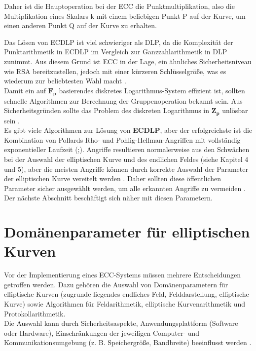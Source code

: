 Daher ist die Hauptoperation bei der ECC die Punktmultiplikation, also die Multiplikation eines Skalars k mit einem beliebigen Punkt P auf der Kurve, um einen anderen Punkt Q auf der Kurve zu erhalten. 

Das Lösen von ECDLP ist viel schwieriger als DLP, da die Komplexität der Punktarithmetik in ECDLP im Vergleich zur Ganzzahlarithmetik in DLP zunimmt. 
Aus diesem Grund ist ECC in der Lage, ein ähnliches Sicherheitsniveau wie RSA bereitzustellen, jedoch mit einer kürzeren Schlüsselgröße, was es wiederum zur beliebtesten Wahl macht \cite{mo2014}.\\ 

Damit ein auf $ \mathbf{F_p} $ basierendes diskretes Logarithmus-System effizient ist, sollten schnelle Algorithmen zur Berechnung der Gruppenoperation bekannt sein. Aus Sicherheitsgründen sollte das Problem des diskreten Logarithmus in $ \mathbf{Z_p} $ unlösbar sein \cite{Hankerson}. \\
Es gibt viele Algorithmen zur Lösung von \textbf{ECDLP}, aber der erfolgreichste ist die Kombination von Pollards Rho- und Pohlig-Hellman-Angriffen mit vollständig exponentieller Laufzeit (\cite{mo2014};\cite{Hankerson}). 
Angriffe resultieren normalerweise aus den Schwächen bei der Auswahl der elliptischen Kurve und des endlichen Feldes (siehe Kapitel 4 und 5), aber die meisten Angriffe können durch korrekte Auswahl der Parameter der elliptischen Kurve vereitelt werden \cite{mo2014}.
Daher sollten diese öffentlichen Parameter sicher ausgewählt werden, um alle erkannten Angriffe zu vermeiden \cite{aliKa}. Der nächste Abschnitt beschäftigt sich näher mit diesen Parametern. 

\section{Domänenparameter für elliptischen Kurven}

Vor der Implementierung eines ECC-Systems müssen mehrere Entscheidungen getroffen werden.
Dazu gehören die Auswahl von Domänenparametern für elliptische Kurven (zugrunde liegendes endliches Feld, Felddarstellung, elliptische Kurve) sowie Algorithmen für Feldarithmetik, elliptische Kurvenarithmetik und Protokollarithmetik.\\

Die Auswahl kann durch Sicherheitsaspekte, Anwendungsplattform (Software oder Hardware), Einschränkungen der jeweiligen Computer- und Kommunikationsumgebung (z. B. Speichergröße, Bandbreite) beeinflusst werden \cite{Havaze}.\\

